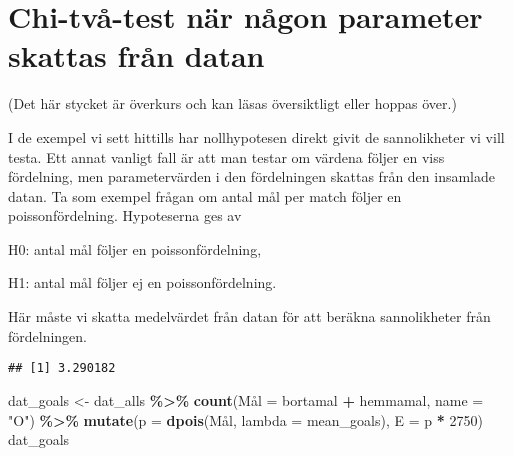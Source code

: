 \documentclass[
]{book}
\newenvironment{Shaded}{\begin{snugshade}}{\end{snugshade}}
\newcommand{\AttributeTok}[1]{\textcolor[rgb]{0.13,0.29,0.53}{#1}}
\newcommand{\DecValTok}[1]{\textcolor[rgb]{0.00,0.00,0.81}{#1}}
\newcommand{\FunctionTok}[1]{\textcolor[rgb]{0.13,0.29,0.53}{\textbf{#1}}}
\newcommand{\NormalTok}[1]{#1}
\newcommand{\OtherTok}[1]{\textcolor[rgb]{0.56,0.35,0.01}{#1}}
\newcommand{\SpecialCharTok}[1]{\textcolor[rgb]{0.81,0.36,0.00}{\textbf{#1}}}
\newcommand{\StringTok}[1]{\textcolor[rgb]{0.31,0.60,0.02}{#1}}
\theoremstyle{definition}
\theoremstyle{definition}
\theoremstyle{definition}
\theoremstyle{definition}
\theoremstyle{remark}
\begin{document}
\hypertarget{chi-tvuxe5-test-nuxe4r-nuxe5gon-parameter-skattas-fruxe5n-datan}{%
\section{Chi-två-test när någon parameter skattas från datan}\label{chi-tvuxe5-test-nuxe4r-nuxe5gon-parameter-skattas-fruxe5n-datan}}

(Det här stycket är överkurs och kan läsas översiktligt eller hoppas över.)

I de exempel vi sett hittills har nollhypotesen direkt givit de sannolikheter vi vill testa. Ett annat vanligt fall är att man testar om värdena följer en viss fördelning, men parametervärden i den fördelningen skattas från den insamlade datan. Ta som exempel frågan om antal mål per match följer en poissonfördelning. Hypoteserna ges av

H0: antal mål följer en poissonfördelning,

H1: antal mål följer ej en poissonfördelning.

Här måste vi skatta medelvärdet från datan för att beräkna sannolikheter från fördelningen.

\begin{Shaded}
\end{Shaded}

\begin{verbatim}
## [1] 3.290182
\end{verbatim}

\begin{Shaded}
\begin{Highlighting}[]
\NormalTok{dat\_goals }\OtherTok{\textless{}{-}}\NormalTok{ dat\_alls }\SpecialCharTok{\%\textgreater{}\%} 
  \FunctionTok{count}\NormalTok{(Mål }\OtherTok{=}\NormalTok{ bortamal }\SpecialCharTok{+}\NormalTok{ hemmamal, }\AttributeTok{name =} \StringTok{"O"}\NormalTok{) }\SpecialCharTok{\%\textgreater{}\%} 
  \FunctionTok{mutate}\NormalTok{(}\AttributeTok{p =} \FunctionTok{dpois}\NormalTok{(Mål, }\AttributeTok{lambda =}\NormalTok{ mean\_goals),}
         \AttributeTok{E =}\NormalTok{ p }\SpecialCharTok{*} \DecValTok{2750}\NormalTok{)}
\NormalTok{dat\_goals}
\end{Highlighting}
\end{Shaded}
\end{document}
